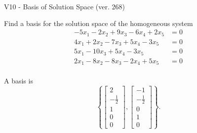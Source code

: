 \begin{exercise}
  \begin{exerciseTitle}V10 - Basis of Solution Space (ver. 268)\end{exerciseTitle}
  \begin{exerciseStatement}
    Find a basis for the solution space of the homogeneous system 
\begin{align*}
 -5 x_ 1 -2 x_ 2 + 9 x_ 3 -6 x_ 4 + 2 x_ 5 &= 0  \\ 
  4 x_ 1 + 2 x_ 2 -7 x_ 3 + 5 x_ 4 -3 x_ 5 &= 0  \\ 
  5 x_ 1 -10 x_ 3 + 5 x_ 4 -3 x_ 5 &= 0  \\ 
  2 x_ 1 -8 x_ 2 -8 x_ 3 -2 x_ 4 + 5 x_ 5 &= 0  \\ 
 \end{align*}


 
  \end{exerciseStatement}

  \begin{exerciseAnswer}
   A basis is   
\[\left\{\left[\begin{array}{c}
2 \\
-\frac{1}{2} \\
1 \\
0 \\
0
\end{array}\right] , \left[\begin{array}{c}
-1 \\
-\frac{1}{2} \\
0 \\
1 \\
0
\end{array}\right]\right\}.\]

  


  \end{exerciseAnswer}
\end{exercise}